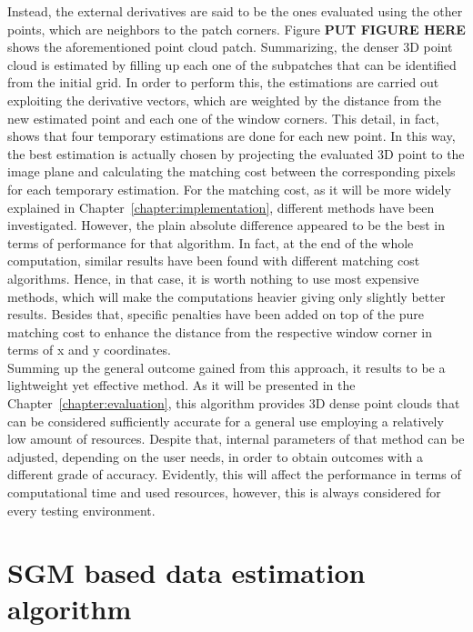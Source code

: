 Instead, the external derivatives are said to be the ones evaluated using the other points, which are neighbors to the patch corners. 
Figure \textbf{PUT FIGURE HERE} shows the aforementioned point cloud patch. 
Summarizing, the denser 3D point cloud is estimated by filling up each one of the subpatches that can be identified from the initial grid. 
In order to perform this, the estimations are carried out exploiting the derivative vectors, which are weighted by the distance from the new estimated point and each one of the window corners.
This detail, in fact, shows that four temporary estimations are done for each new point. 
In this way, the best estimation is actually chosen by projecting the evaluated 3D point to the image plane and calculating the matching cost between the corresponding pixels for each temporary estimation.
For the matching cost, as it will be more widely explained in Chapter~\ref{chapter:implementation}, different methods have been investigated.
However, the plain absolute difference appeared to be the best in terms of performance for that algorithm.
In fact, at the end of the whole computation, similar results have been found with different matching cost algorithms.
Hence, in that case, it is worth nothing to use most expensive methods, which will make the computations heavier giving only slightly better results.
Besides that, specific penalties have been added on top of the pure matching cost to enhance the distance from the respective window corner in terms of x and y coordinates.\\
Summing up the general outcome gained from this approach, it results to be a lightweight yet effective method.
As it will be presented in the Chapter~\ref{chapter:evaluation}, this algorithm provides 3D dense point clouds that can be considered sufficiently accurate for a general use employing a relatively low amount of resources.
Despite that, internal parameters of that method can be adjusted, depending on the user needs, in order to obtain outcomes with a different grade of accuracy. 
Evidently, this will affect the performance in terms of computational time and used resources, however, this is always considered for every testing environment. \\

\section{SGM based data estimation algorithm}
\label{section:sgm-based-algorithm}

